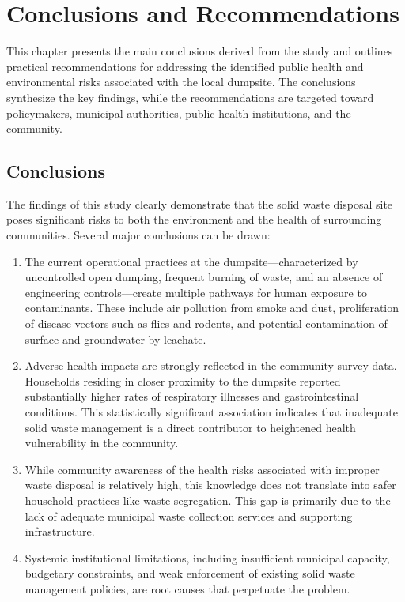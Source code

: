 
\chapter{Conclusions and Recommendations}
\label{chap:conclusions}

This chapter presents the main conclusions derived from the study and outlines practical recommendations for addressing the identified public health and environmental risks associated with the local dumpsite. The conclusions synthesize the key findings, while the recommendations are targeted toward policymakers, municipal authorities, public health institutions, and the community.

\section{Conclusions}
The findings of this study clearly demonstrate that the solid waste disposal site poses significant risks to both the environment and the health of surrounding communities. Several major conclusions can be drawn:

\begin{enumerate}
    \item The current operational practices at the dumpsite—characterized by uncontrolled open dumping, frequent burning of waste, and an absence of engineering controls—create multiple pathways for human exposure to contaminants. These include air pollution from smoke and dust, proliferation of disease vectors such as flies and rodents, and potential contamination of surface and groundwater by leachate.

    \item Adverse health impacts are strongly reflected in the community survey data. Households residing in closer proximity to the dumpsite reported substantially higher rates of respiratory illnesses and gastrointestinal conditions. This statistically significant association indicates that inadequate solid waste management is a direct contributor to heightened health vulnerability in the community.

    \item While community awareness of the health risks associated with improper waste disposal is relatively high, this knowledge does not translate into safer household practices like waste segregation. This gap is primarily due to the lack of adequate municipal waste collection services and supporting infrastructure.

    \item Systemic institutional limitations, including insufficient municipal capacity, budgetary constraints, and weak enforcement of existing solid waste management policies, are root causes that perpetuate the problem.
\end{enumerate}

